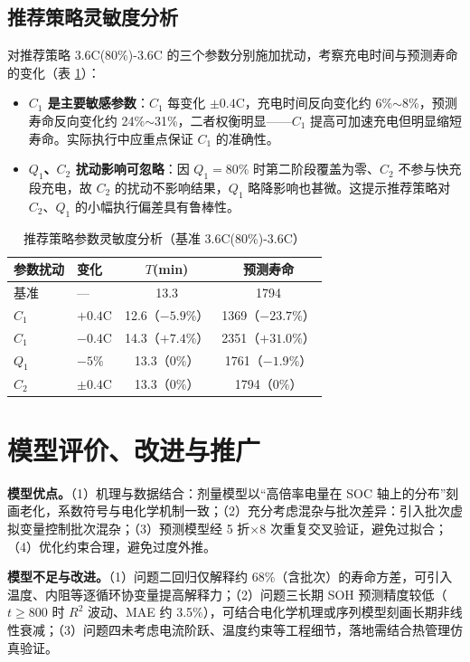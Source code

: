 \documentclass[withoutpreface]{cumcmthesis}
\begin{document}
\subsection{推荐策略灵敏度分析}

对推荐策略 3.6C(80\%)-3.6C 的三个参数分别施加扰动，考察充电时间与预测寿命的变化（表 \ref{tab:sens}）：
\begin{itemize}
\item \textbf{$C_1$ 是主要敏感参数}：$C_1$ 每变化 $\pm0.4$C，充电时间反向变化约 6\%$\sim$8\%，预测寿命反向变化约 24\%$\sim$31\%，二者权衡明显——$C_1$ 提高可加速充电但明显缩短寿命。实际执行中应重点保证 $C_1$ 的准确性。
\item \textbf{$Q_1$、$C_2$ 扰动影响可忽略}：因 $Q_1=80\%$ 时第二阶段覆盖为零、$C_2$ 不参与快充段充电，故 $C_2$ 的扰动不影响结果，$Q_1$ 略降影响也甚微。这提示推荐策略对 $C_2$、$Q_1$ 的小幅执行偏差具有鲁棒性。
\end{itemize}

\begin{table}[htbp]
\centering
\caption{推荐策略参数灵敏度分析（基准 3.6C(80\%)-3.6C）}
\label{tab:sens}
\begin{tabular}{llcc}
\toprule
参数扰动 & 变化 & $T$(min) & 预测寿命 \\
\midrule
基准 & --- & 13.3 & 1794 \\
$C_1$ & $+0.4$C & 12.6（$-5.9\%$） & 1369（$-23.7\%$） \\
$C_1$ & $-0.4$C & 14.3（$+7.4\%$） & 2351（$+31.0\%$） \\
$Q_1$ & $-5\%$ & 13.3（$0\%$） & 1761（$-1.9\%$） \\
$C_2$ & $\pm0.4$C & 13.3（$0\%$） & 1794（$0\%$） \\
\bottomrule
\end{tabular}
\end{table}

\section{模型评价、改进与推广}

\textbf{模型优点。}（1）机理与数据结合：剂量模型以“高倍率电量在 SOC 轴上的分布”刻画老化，系数符号与电化学机制一致；（2）充分考虑混杂与批次差异：引入批次虚拟变量控制批次混杂；（3）预测模型经 5 折$\times$8 次重复交叉验证，避免过拟合；（4）优化约束合理，避免过度外推。

\textbf{模型不足与改进。}（1）问题二回归仅解释约 68\%（含批次）的寿命方差，可引入温度、内阻等逐循环协变量提高解释力；（2）问题三长期 SOH 预测精度较低（$t\ge800$ 时 $R^2$ 波动、MAE 约 3.5\%），可结合电化学机理或序列模型刻画长期非线性衰减；（3）问题四未考虑电流阶跃、温度约束等工程细节，落地需结合热管理仿真验证。
\end{document}
